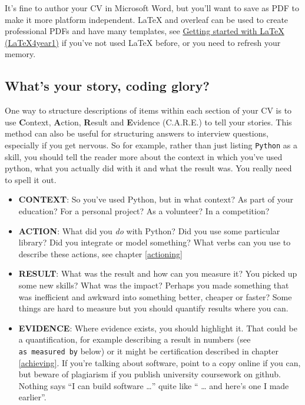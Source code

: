 \documentclass[
]{book}
\providecommand{\tightlist}{%
  \setlength{\itemsep}{0pt}\setlength{\parskip}{0pt}}
\begin{document}
It's fine to author your CV in Microsoft Word, but you'll want to save as PDF to make it more platform independent. LaTeX and overleaf can be used to create professional PDFs and have many templates, see \href{https://latex4year1.netlify.app/}{Getting started with LaTeX (LaTeX4year1)} if you've not used LaTeX before, or you need to refresh your memory. \citep{latex4year1}

\hypertarget{care}{%
\subsection{What's your story, coding glory?}\label{care}}

One way to structure descriptions of items within each section of your CV is to use \textbf{C}ontext, \textbf{A}ction, \textbf{R}esult and \textbf{E}vidence (C.A.R.E.) to tell your stories. This method can also be useful for structuring answers to interview questions, especially if you get nervous. So for example, rather than just listing \texttt{Python} as a skill, you should tell the reader more about the context in which you've used python, what you actually did with it and what the result was. You really need to spell it out.

\begin{itemize}
\tightlist
\item
  \textbf{CONTEXT}: So you've used Python, but in what context? As part of your education? For a personal project? As a volunteer? In a competition?
\item
  \textbf{ACTION}: What did you \emph{do} with Python? Did you use some particular library? Did you integrate or model something? What verbs can you use to describe these actions, see chapter \ref{actioning}
\item
  \textbf{RESULT}: What was the result and how can you measure it? You picked up some new skills? What was the impact? Perhaps you made something that was inefficient and awkward into something better, cheaper or faster? Some things are hard to measure but you should quantify results where you can.
\item
  \textbf{EVIDENCE}: Where evidence exists, you should highlight it. That could be a quantification, for example describing a result in numbers (see \texttt{as\ measured\ by} below) or it might be certification described in chapter \ref{achieving}. If you're talking about software, point to a copy online if you can, but beware of plagiarism if you publish university coursework on github. Nothing says ``I can build software \ldots{}'' quite like `` \ldots{} and here's one I made earlier''.
\end{itemize}
\end{document}
